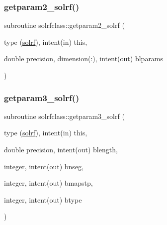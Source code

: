 \mbox{\label{namespacesolrfclass_ac8cc63a77159c54d547e156bf816e7d1}} 
\subsubsection{\texorpdfstring{getparam2\_solrf()}{getparam2\_solrf()}}
{\footnotesize\ttfamily subroutine solrfclass\+::getparam2\+\_\+solrf (\begin{DoxyParamCaption}\item[{type (\mbox{\hyperlink{namespacesolrfclass_structsolrfclass_1_1solrf}{solrf}}), intent(in)}]{this,  }\item[{double precision, dimension(\+:), intent(out)}]{blparams }\end{DoxyParamCaption})}

\mbox{\label{namespacesolrfclass_abb727d5c5f8ebd6af19e036fe9204923}} 
\subsubsection{\texorpdfstring{getparam3\_solrf()}{getparam3\_solrf()}}
{\footnotesize\ttfamily subroutine solrfclass\+::getparam3\+\_\+solrf (\begin{DoxyParamCaption}\item[{type (\mbox{\hyperlink{namespacesolrfclass_structsolrfclass_1_1solrf}{solrf}}), intent(in)}]{this,  }\item[{double precision, intent(out)}]{blength,  }\item[{integer, intent(out)}]{bnseg,  }\item[{integer, intent(out)}]{bmapstp,  }\item[{integer, intent(out)}]{btype }\end{DoxyParamCaption})}

\mbox{\label{namespacesolrfclass_aaf806853862c8c4b3f448ca750500178}} 
